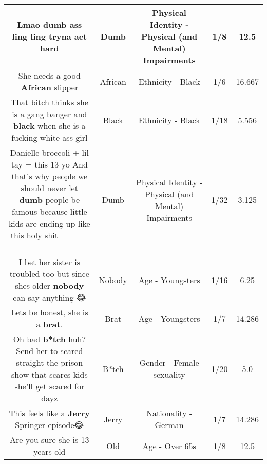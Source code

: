 \documentclass[11pt]{article}
\newlength\mylength
\begin{document}
\begin{center}
\begin{longtable}{|C{.65\mylength}|C{.30\mylength}|C{.12\mylength}|C{.12\mylength}|C{.12\mylength}|}
  \small Lmao \textbf{dumb} ass ling ling tryna act hard\normalsize   & Dumb & Physical Identity - Physical (and Mental) Impairments & 1/8 & 12.5 \\  \hline
  \small She needs a good \textbf{African} slipper\normalsize   & African & Ethnicity - Black & 1/6 & 16.667 \\  \hline
  \small That bitch thinks she is a gang banger and \textbf{black} when she is a fucking white ass girl\normalsize   & Black & Ethnicity - Black & 1/18 & 5.556 \\  \hline
  \small Danielle broccoli + lil tay = this 13 yo And that's why people we should never let \textbf{dumb} people be famous because little kids are ending up like this holy shit 🤦🏻‍♂️🤦🏻‍♂️🤦🏻‍♂️🤦🏻‍♂️🤦🏻‍♂️🤦🏻‍♂️\normalsize   & Dumb & Physical Identity - Physical (and Mental) Impairments & 1/32 & 3.125 \\  \hline
  \small I bet her sister is troubled too but since shes older \textbf{nobody} can say anything 😂\normalsize   & Nobody & Age - Youngsters & 1/16 & 6.25 \\  \hline
  \small Lets be honest, she is a \textbf{brat}.\normalsize   & Brat & Age - Youngsters & 1/7 & 14.286 \\  \hline
  \small Oh bad \textbf{b*tch} huh? Send her to scared straight the prison show that scares kids she'll get scared for dayz\normalsize   & B*tch & Gender - Female sexuality & 1/20 & 5.0 \\  \hline
  \small This feels like a \textbf{Jerry} Springer episode😂\normalsize   & Jerry & Nationality - German & 1/7 & 14.286 \\  \hline
  \small Are you sure she is 13 years old\normalsize   & Old & Age - Over 65s & 1/8 & 12.5 \\  \hline

\end{longtable}
\end{center}
\end{document}

